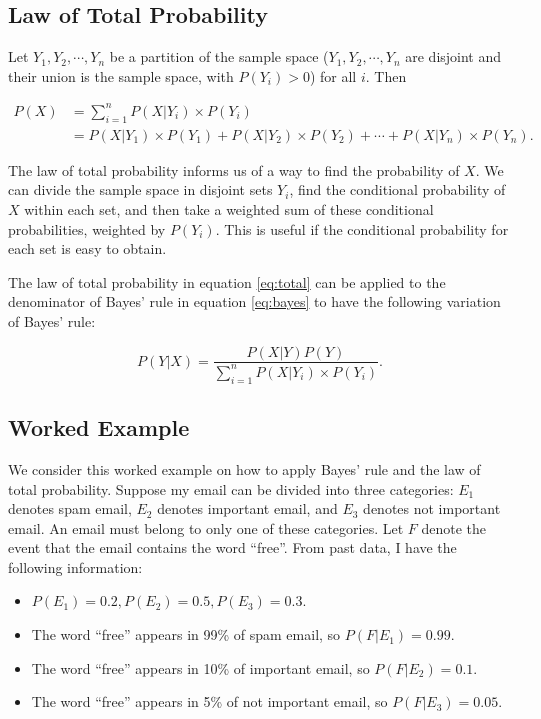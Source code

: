 \documentclass[
]{book}
\providecommand{\tightlist}{%
  \setlength{\itemsep}{0pt}\setlength{\parskip}{0pt}}
\begin{document}
\subsection{Law of Total Probability}\label{law-of-total-probability}

Let \(Y_1, Y_2, \cdots, Y_n\) be a partition of the sample space (\(Y_1, Y_2, \cdots, Y_n\) are disjoint and their union is the sample space, with \(P(Y_i) > 0\)) for all \(i\). Then

\begin{equation} 
\begin{split}
P(X) &= \sum_{i=1}^n P(X|Y_i) \times P(Y_i)\\
    &= P(X|Y_1) \times P(Y_1) + P(X|Y_2) \times P(Y_2) + \cdots + P(X|Y_n) \times P(Y_n).
\end{split}
\label{eq:total}
\end{equation}

The law of total probability informs us of a way to find the probability of \(X\). We can divide the sample space in disjoint sets \(Y_i\), find the conditional probability of \(X\) within each set, and then take a weighted sum of these conditional probabilities, weighted by \(P(Y_i)\). This is useful if the conditional probability for each set is easy to obtain.

The law of total probability in equation \eqref{eq:total} can be applied to the denominator of Bayes' rule in equation \eqref{eq:bayes} to have the following variation of Bayes' rule:

\begin{equation} 
P(Y|X) = \frac{P(X|Y)P(Y)}{\sum_{i=1}^n P(X|Y_i) \times P(Y_i)}.
\label{eq:bayes2}
\end{equation}

\subsection{Worked Example}\label{worked-example}

We consider this worked example on how to apply Bayes' rule and the law of total probability. Suppose my email can be divided into three categories: \(E_1\) denotes spam email, \(E_2\) denotes important email, and \(E_3\) denotes not important email. An email must belong to only one of these categories. Let \(F\) denote the event that the email contains the word ``free''. From past data, I have the following information:

\begin{itemize}
\tightlist
\item
  \(P(E_1) = 0.2, P(E_2) = 0.5, P(E_3) = 0.3\).
\item
  The word ``free'' appears in 99\% of spam email, so \(P(F|E_1) = 0.99\).
\item
  The word ``free'' appears in 10\% of important email, so \(P(F|E_2) = 0.1\).
\item
  The word ``free'' appears in 5\% of not important email, so \(P(F|E_3) = 0.05\).
\end{itemize}
\end{document}
